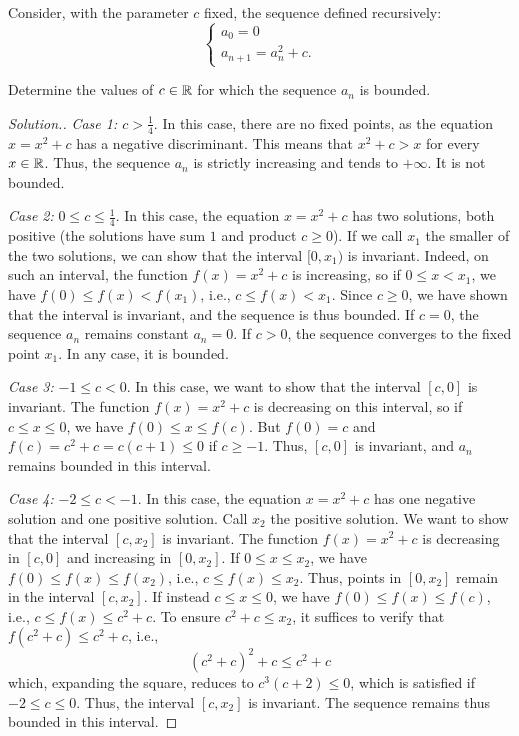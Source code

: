 \begin{exercise}
\label{ex:mandelbrot_reale}
Consider, with the parameter $c$ fixed, the sequence defined recursively:
\[
  \begin{cases}
    a_0 = 0\\
    a_{n+1} = a_n^2 + c.
  \end{cases}
\]

Determine the values of $c\in {\mathbb R}$ for which the sequence $a_n$ is
bounded.
\end{exercise}
%
\begin{proof}[Solution.]
\emph{Case 1: $c > \frac 1 4$}.
In this case, there are no fixed points, as the equation $x=x^2+c$ has
a negative discriminant. This means that $x^2+c > x$ for every $x\in {\mathbb R}$. Thus,
the sequence $a_n$ is strictly increasing and tends to $+\infty$.
It is not bounded.

\emph{Case 2:} $0\le c \le \frac 1 4$.
In this case, the equation $x=x^2+c$ has two solutions, both positive
(the solutions have sum $1$ and product $c\ge 0$).
If we call $x_1$ the smaller of the two solutions, we can show that
the interval $[0,x_1)$ is invariant. Indeed, on such an interval, the function
$f(x)=x^2+c$ is increasing, so if $0\le x < x_1$, we have $f(0) \le f(x) <
f(x_1)$,
i.e., $c \le f(x) < x_1$. Since $c\ge 0$, we have shown that the interval is
invariant, and the sequence is thus bounded.
If $c=0$, the sequence $a_n$ remains constant $a_n=0$. If $c>0$, the sequence
converges to the fixed point $x_1$. In any case, it is bounded.

\emph{Case 3:} $-1 \le c < 0$.
In this case, we want to show that the interval $[c,0]$ is invariant.
The function $f(x) = x^2+c$ is decreasing on this interval, so
if $c\le x \le 0$, we have $f(0)\le x \le f(c)$. But $f(0)=c$ and $f(c)=c^2+c
= c(c+1) \le 0$ if $c\ge -1$. Thus, $[c,0]$ is invariant, and $a_n$ remains
bounded in this interval.

\emph{Case 4:} $-2\le c < -1$.
In this case, the equation $x=x^2+c$ has one negative solution and one positive
solution.
Call $x_2$ the positive solution. We want to show that
the interval $[c,x_2]$ is invariant.
The function $f(x)=x^2+c$ is decreasing in $[c,0]$ and increasing in $[0,x_2]$.
If $0\le x \le x_2$, we have $f(0)\le f(x) \le f(x_2)$,
i.e., $c \le f(x) \le x_2$. Thus, points in $[0,x_2]$ remain in the interval
$[c,x_2]$.
If instead $c\le x \le 0$, we have $f(0)\le f(x) \le f(c)$, i.e., $c \le f(x)
\le c^2+c$.
To ensure $c^2+c\le x_2$, it suffices to verify that $f(c^2+c)\le c^2+c$,
i.e.,
\[
  (c^2+c)^2 + c \le c^2+c
\]
which, expanding the square, reduces to $c^3(c+2)\le 0$, which is satisfied
if $-2 \le c \le 0$.
Thus, the interval $[c,x_2]$ is invariant. The sequence remains thus
bounded in this interval.


\end{proof}
